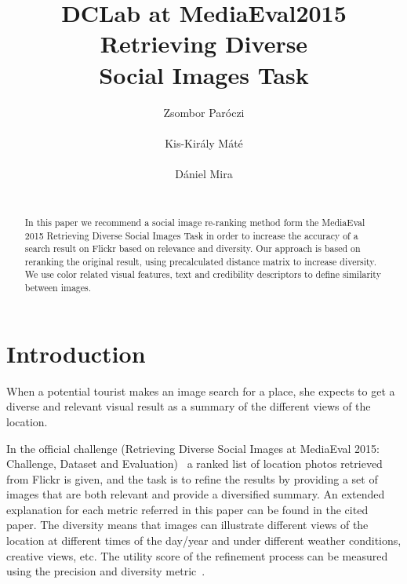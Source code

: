 \documentclass{sig-alternate}
\begin{document}

\title{DCLab at MediaEval2015 Retrieving Diverse \\ Social Images Task}


\author{
\alignauthor
Zsombor Par\'oczi\\
       \\
\alignauthor
Kis-Kir\'aly M\'at\'e \\
		\\
\alignauthor
D\'aniel Mira\\
		\\
}

\maketitle
\begin{abstract}
In this paper we recommend a social image re-ranking method form the MediaEval 2015 Retrieving Diverse Social Images Task in order to increase the accuracy of a search result on Flickr based on relevance and diversity. Our approach is based on reranking the original result, using precalculated distance matrix to increase diversity. We use color related visual features, text and credibility descriptors to define similarity between images.
\end{abstract}

\section{Introduction}

When a potential tourist makes an image search for a place, she expects to get a diverse and relevant visual result as a summary of the different views of the location. 

In the official challenge (Retrieving Diverse Social Images at MediaEval 2015: Challenge, Dataset and Evaluation)~\cite{Task2015} a ranked list of location photos retrieved from Flickr is given, and the task is to refine the results by providing a set of images that are both relevant and provide a diversified summary. An extended explanation for each metric referred in this paper can be found in the cited paper. The diversity means that images can illustrate different views of the location at different times of the day/year and under different weather conditions, creative views, etc. The utility score of the refinement process can be measured using the precision and diversity metric~\cite{Taneva2010}. 
\end{document}
